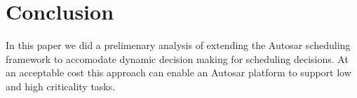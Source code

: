 \section{Conclusion}
In this paper we did a prelimenary analysis of extending the Autosar scheduling
framework to accomodate dynamic decision making for scheduling decisions.
At an acceptable cost this approach can enable an Autosar platform to support low
and high criticality tasks.

